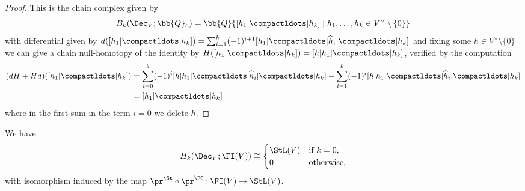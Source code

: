 \documentclass[a4paper]{amsart}
\begin{document}
\begin{proof}This is the chain complex given by
\[B_k(\Dec_V;\bb{Q}_0) = \bb{Q}\{[h_1|\compactldots|h_k] \mid h_1,\ldots,h_k \in V^\vee \setminus \{0\}\}\]
with differential given by $d([h_1|\compactldots|h_k]) = \sum_{i=1}^{k} (-1)^{i+1} [h_1|\compactldots|\widehat{h}_i|\compactldots|h_k]$ and fixing some $h \in V^\vee \setminus \{0\}$ we can give a chain null-homotopy of the identity by $H([h_1|\compactldots|h_k]) = [h|h_1|\compactldots|h_k]$, verified by the computation
\begin{align*}(dH+Hd)([h_1|\compactldots|h_k]) &= \sum_{i=0}^{k} (-1)^i [h|h_1|\compactldots|\widehat{h}_i|\compactldots|h_k] -\sum_{i=1}^k (-1)^i[h|h_1|\compactldots|\widehat{h}_i|\compactldots|h_k] \\
&= [h_1|\compactldots|h_k]\end{align*}
where in the first sum in the term $i=0$ we delete $h$.
\end{proof}

\begin{lemma}\label{lem:stl-fi-resolution} We have
\[H_k(\Dec_V;\FI(V)) \cong \begin{cases} \StL(V) & \text{if $k=0$,} \\
0 & \text{otherwise,}\end{cases}\]
with isomorphism induced by the map $\pr^\St \circ \pr^\FC \colon \FI(V) \to \StL(V)$.\end{lemma}
\end{document}
